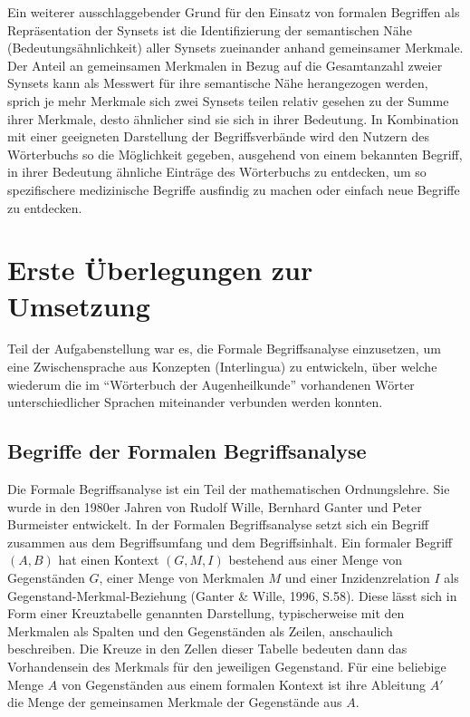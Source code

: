 \documentclass[pagesize,paper=A4,DIV=calc,fontsize=12pt,draft=false]{scrreprt}
\begin{document}
Ein weiterer ausschlaggebender Grund für den Einsatz von formalen Begriffen als Repräsentation der Synsets ist die Identifizierung der semantischen Nähe (Bedeutungsähnlichkeit) aller Synsets zueinander anhand gemeinsamer Merkmale. 
Der Anteil an gemeinsamen Merkmalen in Bezug auf die Gesamtanzahl zweier Synsets kann als Messwert für ihre semantische Nähe herangezogen werden, sprich je mehr Merkmale sich zwei Synsets teilen relativ gesehen zu der Summe ihrer Merkmale, desto ähnlicher sind sie sich in ihrer Bedeutung. 
In Kombination mit einer geeigneten Darstellung der Begriffsverbände wird den Nutzern des Wörterbuchs so die Möglichkeit gegeben, ausgehend von einem bekannten Begriff, in ihrer Bedeutung ähnliche Einträge des Wörterbuchs zu entdecken, um so spezifischere medizinische Begriffe ausfindig zu machen oder einfach neue Begriffe zu entdecken. 

\section{Erste Überlegungen zur Umsetzung}

Teil der Aufgabenstellung war es, die Formale Begriffsanalyse einzusetzen, um eine Zwischensprache aus Konzepten (Interlingua) zu entwickeln, über welche wiederum die im \enquote{Wörterbuch der Augenheilkunde} vorhandenen Wörter unterschiedlicher Sprachen miteinander verbunden werden konnten.

\subsection{Begriffe der Formalen Begriffsanalyse}
\label{subsec:fba}

Die Formale Begriffsanalyse ist ein Teil der mathematischen Ordnungslehre. 
Sie wurde in den 1980er Jahren von Rudolf Wille, Bernhard Ganter und Peter Burmeister entwickelt. 
In der Formalen Begriffsanalyse setzt sich ein Begriff zusammen aus dem Begriffsumfang und dem Begriffsinhalt. 
Ein formaler Begriff $(A,B)$ hat einen Kontext $(G,M,I)$ bestehend aus einer Menge von Gegenständen $G$, einer Menge von Merkmalen $M$ und einer Inzidenzrelation $I$ als Gegenstand-Merkmal-Beziehung (Ganter \& Wille, 1996, S.58). 
Diese lässt sich in Form einer Kreuztabelle genannten Darstellung, typischerweise mit den Merkmalen als Spalten und den Gegenständen als Zeilen, anschaulich beschreiben. 
Die Kreuze in den Zellen dieser Tabelle bedeuten dann das Vorhandensein des Merkmals für den jeweiligen Gegenstand. 
Für eine beliebige Menge $A$ von Gegenständen aus einem formalen Kontext ist ihre Ableitung $A'$ die Menge der gemeinsamen Merkmale der Gegenstände aus $A$. 
\end{document}
